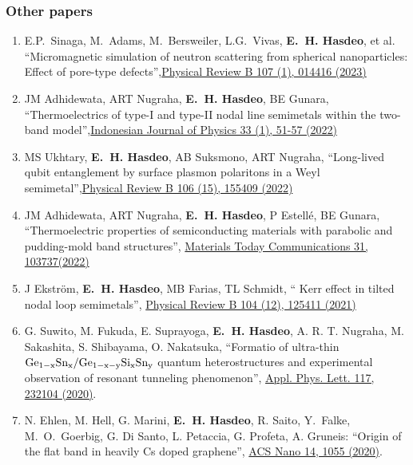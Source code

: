 \documentclass[a4paper,11pt]{article}
\def\hes{{\bf E.~H. Hasdeo}}
\begin{document}
\subsubsection*{Other papers}
\begin{enumerate}
 \item E.P.~Sinaga, M.~Adams, M.~Bersweiler, L.G.~Vivas, \hes, et al.
   ``Micromagnetic simulation of neutron scattering from spherical nanoparticles: Effect of pore-type defects'',\href{https://doi.org/10.1103/PhysRevB.107.014416}{Physical Review B 107 (1), 014416 (2023)}
 \item JM Adhidewata, ART Nugraha, \hes, BE Gunara, ``Thermoelectrics of type-I and type-II nodal line semimetals within the two-band model'',\href{https://ijphysics.fi.itb.ac.id/index.php/ijp/article/download/326/307}{Indonesian Journal of Physics 33 (1), 51-57 (2022)}
   
 \item MS Ukhtary, \hes, AB Suksmono, ART Nugraha, ``Long-lived qubit entanglement by surface plasmon polaritons in a Weyl semimetal'',\href{https://doi.org/10.1103/PhysRevB.106.155409}{Physical Review B 106 (15), 155409 (2022)}

\item   JM Adhidewata, ART Nugraha, \hes, P Estellé, BE Gunara, ``Thermoelectric properties of semiconducting materials with parabolic and pudding-mold band structures'', \href{https://www.sciencedirect.com/science/article/pii/S2352492822005979}{Materials Today Communications 31, 103737(2022)}
\item J Ekström, \hes, MB Farias, TL Schmidt, `` Kerr effect in tilted nodal loop semimetals'', \href{https://doi.org/10.1103/PhysRevB.104.125411}{Physical Review B 104 (12), 125411 (2021)}

\item G. Suwito, M. Fukuda, E. Suprayoga, \hes, A. R. T. Nugraha, M. Sakashita, S. Shibayama, O. Nakatsuka, ``Formatio of ultra-thin $\rm Ge_{1-x}Sn_x/Ge_{1-x-y}Si_xSn_y$ quantum heterostructures and experimental observation of resonant tunneling phenomenon'', \href{https://doi.org/10.1063/5.0024905}{Appl. Phys. Lett. 117, 232104 (2020)}.
\item N. Ehlen, M. Hell, G. Marini, \hes, R. Saito, Y.~Falke, M.~O.~Goerbig, G. Di Santo, L. Petaccia, G. Profeta, A. Gruneis: ``Origin of the flat band in heavily Cs doped graphene'', \href{https://doi.org/10.1021/acsnano.9b08622}{ACS Nano 14, 1055 (2020)}.
  

\end{enumerate}
\end{document}
